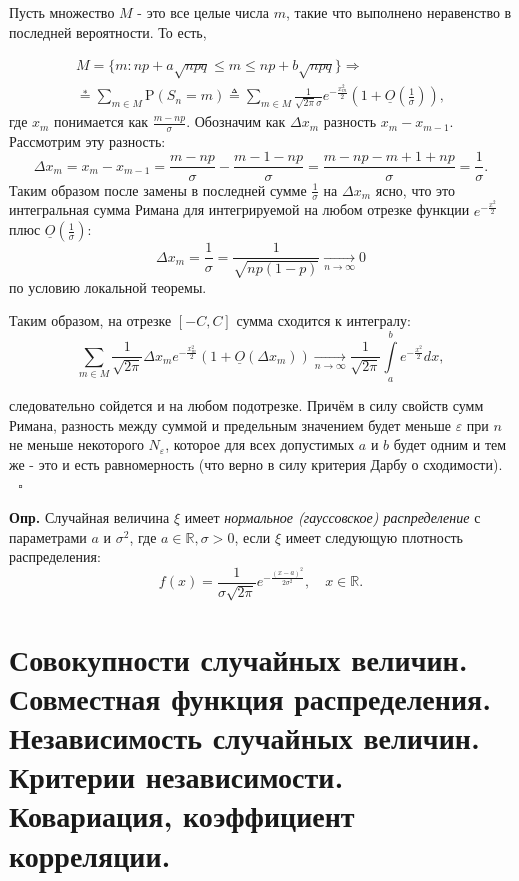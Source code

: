 \documentclass[oneside,final,14pt]{extreport}
\newcommand\mydef{{\bf Опр.}}
\theoremstyle{definition}
\begin{document}
Пусть множество $M$ - это все целые числа $m$, такие что выполнено неравенство в последней вероятности. То есть,

$$\begin{array}{c}
M=\{m: n p+a \sqrt{n p q} \leqslant m \leqslant n p+b \sqrt{n p q}\} \Rightarrow \\
\stackrel{*}{=} \sum\limits_{m \in M} \mathrm{P}\left(S_{n}=m\right) \triangleq \sum_{m \in M} \frac{1}{\sqrt{2 \pi} \sigma} e^{-\frac{x_{m}^{2}}{2}}\left(1+\underline{O}\left(\frac{1}{\sigma}\right)\right),
\end{array}$$
где $x_m$ понимается как $\frac{m - np}{\sigma}.$ Обозначим как $\Delta x_{m}$ разность $x_m - x_{m-1}.$ Рассмотрим эту разность:
$$\Delta x_{m}=x_{m}-x_{m-1}=\frac{m-n p}{\sigma}-\frac{m-1-n p}{\sigma}=\frac{m-n p-m+1+n p}{\sigma}=\frac{1}{\sigma}.$$
Таким образом после замены в последней сумме $\frac{1}{\sigma}$ на $\Delta x_m$ ясно, что это интегральная сумма Римана для интегрируемой на любом отрезке функции $e^{-\frac{x^2}{2}}$ плюс $\underline{O}\left(\frac{1}{\sigma}\right)$:
$$\Delta x_{m}=\frac{1}{\sigma}=\frac{1}{\sqrt{n p(1-p)}} \underset{n \rightarrow \infty}{\longrightarrow} 0$$ по условию локальной теоремы.

Таким образом, на отрезке $[-C,C]$ сумма сходится к интегралу:
$$\sum_{m \in M} \frac{1}{\sqrt{2 \pi}} \Delta x_{m} e^{-\frac{x_{m}^{2}}{2}}\left(1+\underline{O}\left(\Delta x_{m}\right)\right) \underset{n \rightarrow \infty}{\longrightarrow} \frac{1}{\sqrt{2 \pi}} \int\limits_{a}^{b} e^{-\frac{x^{2}}{2}} d x,$$

следовательно сойдется и на любом подотрезке. Причём в
силу свойств сумм Римана, разность между суммой и предельным значением будет
меньше $\varepsilon$ при $n$ не меньше некоторого $N_\varepsilon$, которое для всех допустимых $a$ и $b$ будет одним и тем же - это и есть равномерность (что верно в силу критерия Дарбу о сходимости). $~~~ \square$

\mydef{} Случайная величина $\xi$ имеет {\it нормальное (гауссовское) распределение} с параметрами $a$ и $\sigma^2$, где $a \in \mathbb{R}, \sigma > 0$, если $\xi$ имеет следующую плотность распределения: 
$$f(x)=\frac{1}{\sigma \sqrt{2 \pi}} e^{-\frac{(x-a)^{2}}{2 \sigma^{2}}}, \quad x \in \mathbb{R}.$$

\section{Совокупности случайных величин. Совместная функция распределения. Независимость случайных величин. Критерии независимости. Ковариация, коэффициент корреляции.}
\end{document}
